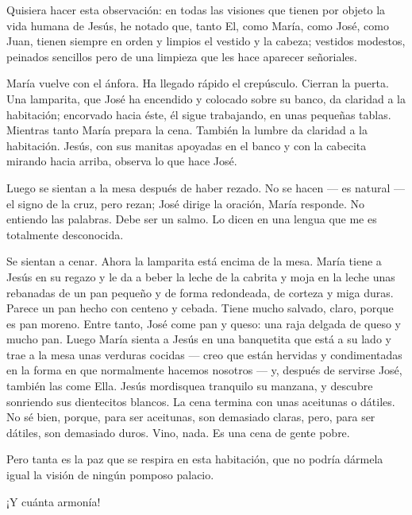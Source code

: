 \documentclass[12pt]{book} %
\begin{document}
Quisiera hacer esta observación: en todas las visiones que tienen por objeto la vida humana de Jesús, he notado que, tanto El, como María, como José, como Juan, tienen siempre en orden y limpios el vestido y la cabeza; vestidos modestos, peinados sencillos pero de una limpieza que les hace aparecer señoriales. 

María vuelve con el ánfora. Ha llegado rápido el crepúsculo. Cierran la puerta. Una lamparita, que José ha encendido y colocado sobre su banco, da claridad a la habitación; encorvado hacia éste, él sigue trabajando, en unas pequeñas tablas. Mientras tanto María prepara la cena. También la lumbre da claridad a la habitación. Jesús, con sus manitas apoyadas en el banco y con la cabecita mirando hacia arriba, observa lo que hace José. 

Luego se sientan a la mesa después de haber rezado. No se hacen — es natural — el signo de la cruz, pero rezan; José dirige la oración, María responde. No entiendo las palabras. Debe ser un salmo. Lo dicen en una lengua que me es totalmente desconocida. 

Se sientan a cenar. Ahora la lamparita está encima de la mesa. María tiene a Jesús en su regazo y le da a beber la leche de la cabrita y moja en la leche unas rebanadas de un pan pequeño y de forma redondeada, de corteza y miga duras. Parece un pan hecho con centeno y cebada. Tiene mucho salvado, claro, porque es pan moreno. Entre tanto, José come pan y queso: una raja delgada de queso y mucho pan. Luego María sienta a Jesús en una banquetita que está a su lado y trae a la mesa unas verduras cocidas — creo que están hervidas y condimentadas en la forma en que normalmente hacemos nosotros — y, después de servirse José, también las come Ella. Jesús mordisquea tranquilo su manzana, y descubre sonriendo sus dientecitos blancos. La cena termina con unas aceitunas o dátiles. No sé bien, porque, para ser aceitunas, son demasiado claras, pero, para ser dátiles, son demasiado duros. Vino, nada. Es una cena de gente pobre. 

Pero tanta es la paz que se respira en esta habitación, que no podría dármela igual la visión de ningún pomposo palacio. 

¡Y cuánta armonía! 
\end{document}
